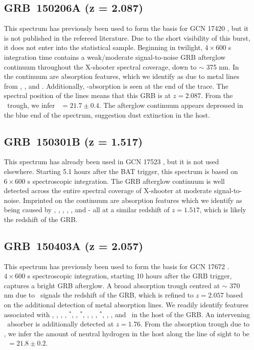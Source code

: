 \documentclass[longauth]{aa}    %
\begin{document}
\subsection{GRB~150206A (z = 2.087)}\label{150206}

This spectrum has previously been used to form the basis for GCN 17420
\citep{GCN17420}, but it is not published in the refereed literature. Due to the
short visibility of this burst, it does not enter into the statistical sample.
Beginning in twilight, $4\times600$ s integration time contains a weak/moderate
signal-to-noise GRB afterglow continuum throughout the X-shooter spectral
coverage, down to $\sim$ 375 nm. In the continuum are absorption features,
which we identify as due to metal lines from \znii, \feii, and \mgii.
Additionally, \lya-absorption is seen at the end of the trace. The spectral
position of the lines means that this GRB is at $z = 2.087$. From the
\lya~trough, we infer \nh~$=21.7 \pm 0.4$. The afterglow continuum appears
depressed in the blue end of the spectrum, suggestion dust extinction in the
host.

\subsection{GRB~150301B (z = 1.517)}\label{150301}

This spectrum has already been used in GCN 17523 \citep{GCN17523}, but it
is not used elsewhere. Starting 5.1 hours after the BAT trigger, this spectrum
is based on $6 \times 600$ s spectroscopic integration. The GRB afterglow
continuum is well detected across the entire spectral coverage of X-shooter at
moderate signal-to-noise. Imprinted on the continuum are absorption features
which we identify as being caused by \SIii, \civ, \alii, \feii, \mgii, and \mgi
- all at a similar redshift of $z = 1.517$, which is likely the redshift of the
GRB.

\subsection{GRB~150403A (z = 2.057)}\label{150403}

This spectrum has previously been used to form the basis for GCN 17672
\citep{GCN17672}. $4 \times 600$ s spectroscopic integration, starting 10 hours
after the GRB trigger, captures a bright GRB afterglow. A broad absorption
trough centred at $\sim$ 370 nm due to \lya~signals the redshift of the GRB,
which is refined to $z = 2.057$ based on the additional detection of metal
absorption lines. We readily identify features associated with \sii, \SIiv, \oi,
\SIii, \SIii$^*$, \cii, \cii$^*$, \civ, \alii, \feii, \feii$^*$, \mni, \mgii,
and \mgi~in the host of the GRB. An intervening \civ~absorber is additionally
detected at $z=1.76$. From the absorption trough due to \lya, we infer the
amount of neutral hydrogen in the host along the line of sight to be \nh~$=21.8
\pm 0.2$.
\end{document}

